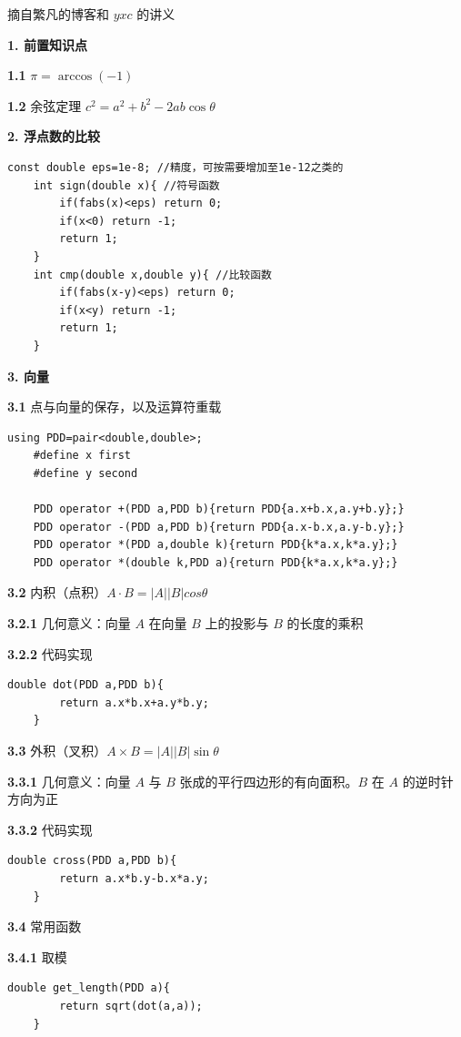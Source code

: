 摘自繁凡的博客和 $yxc$ 的讲义

\textbf{1. 前置知识点}

\textbf{1.1} $\pi=\arccos(-1)$

\textbf{1.2} 余弦定理 $c^2=a^2+b^2-2ab\cos\theta$

\textbf{2. 浮点数的比较}

\begin{lstlisting}[style=C++]
	const double eps=1e-8; //精度，可按需要增加至1e-12之类的
	int sign(double x){ //符号函数
		if(fabs(x)<eps) return 0;
		if(x<0) return -1;
		return 1;
	}
	int cmp(double x,double y){ //比较函数
		if(fabs(x-y)<eps) return 0;
		if(x<y) return -1;
		return 1;
	}
\end{lstlisting}

\textbf{3. 向量}

\textbf{3.1} 点与向量的保存，以及运算符重载

\begin{lstlisting}[style=C++]
	using PDD=pair<double,double>;
	#define x first
	#define y second
	
	PDD operator +(PDD a,PDD b){return PDD{a.x+b.x,a.y+b.y};}
	PDD operator -(PDD a,PDD b){return PDD{a.x-b.x,a.y-b.y};}
	PDD operator *(PDD a,double k){return PDD{k*a.x,k*a.y};}
	PDD operator *(double k,PDD a){return PDD{k*a.x,k*a.y};}
\end{lstlisting}

\textbf{3.2} 内积（点积）$A\cdot B = |A||B|cos\theta$

\textbf{3.2.1} 几何意义：向量 $A$ 在向量 $B$ 上的投影与 $B$ 的长度的乘积

\textbf{3.2.2} 代码实现

\begin{lstlisting}[style=C++]
	double dot(PDD a,PDD b){
		return a.x*b.x+a.y*b.y;
	}
\end{lstlisting}

\textbf{3.3} 外积（叉积）$A\times B=|A||B|\sin\theta$

\textbf{3.3.1} 几何意义：向量 $A$ 与 $B$ 张成的平行四边形的有向面积。$B$ 在 $A$ 的逆时针方向为正

\textbf{3.3.2} 代码实现

\begin{lstlisting}[style=C++]
	double cross(PDD a,PDD b){
		return a.x*b.y-b.x*a.y;
	}
\end{lstlisting}

\textbf{3.4} 常用函数

\textbf{3.4.1} 取模

\begin{lstlisting}[style=C++]
	double get_length(PDD a){
		return sqrt(dot(a,a));
	}
\end{lstlisting}

